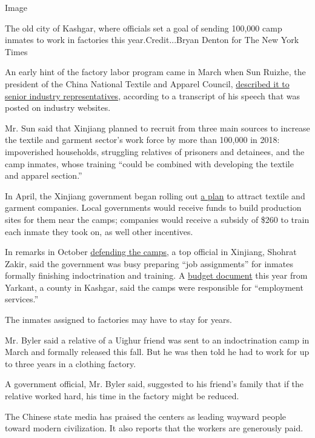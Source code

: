 Image

The old city of Kashgar, where officials set a goal of sending 100,000
camp inmates to work in factories this year.Credit...Bryan Denton for
The New York Times

An early hint of the factory labor program came in March when Sun
Ruizhe, the president of the China National Textile and Apparel Council,
\href{http://www.ccta.org.cn/hyzx/201803/t20180305_3683861.html}{described
it to senior industry representatives}, according to a transcript of his
speech that was posted on industry websites.

Mr. Sun said that Xinjiang planned to recruit from three main sources to
increase the textile and garment sector's work force by more than
100,000 in 2018: impoverished households, struggling relatives of
prisoners and detainees, and the camp inmates, whose training ``could be
combined with developing the textile and apparel section.''

In April, the Xinjiang government began rolling out
\href{https://www.sohu.com/a/227485314_280643}{a plan} to attract
textile and garment companies. Local governments would receive funds to
build production sites for them near the camps; companies would receive
a subsidy of \$260 to train each inmate they took on, as well other
incentives.

In remarks in October
\href{http://www.chinaxinjiang.cn/zixun/xjxw/201810/t20181016_570748.htm}{defending
the camps}, a top official in Xinjiang, Shohrat Zakir, said the
government was busy preparing ``job assignments'' for inmates formally
finishing indoctrination and training. A
\href{http://shache.xinjiang.gov.cn/webpub/bpf/mlgk/viewDetail.jsp?identifier=568884582/2018-00067}{budget
document} this year from Yarkant, a county in Kashgar, said the camps
were responsible for ``employment services.''

The inmates assigned to factories may have to stay for years.

Mr. Byler said a relative of a Uighur friend was sent to an
indoctrination camp in March and formally released this fall. But he was
then told he had to work for up to three years in a clothing factory.

A government official, Mr. Byler said, suggested to his friend's family
that if the relative worked hard, his time in the factory might be
reduced.

The Chinese state media has praised the centers as leading wayward
people toward modern civilization. It also reports that the workers are
generously paid.

